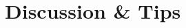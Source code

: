 \documentclass[12pt,preprint]{aastex}
\newcommand{\project}[1]{{\sffamily #1}}
\newcommand{\thisplain}{pipeline}
\newcommand{\this}{\project{\thisplain}}
\newcommand{\sectlabel}[1]{\label{sect:#1}}
\newcommand{\Algo}[1]{Algorithm~\ref{algo:#1}}
\newcommand{\algo}[1]{\Algo{#1}}
\begin{document}


\section{Discussion \& Tips}\sectlabel{advice}


\end{document}
